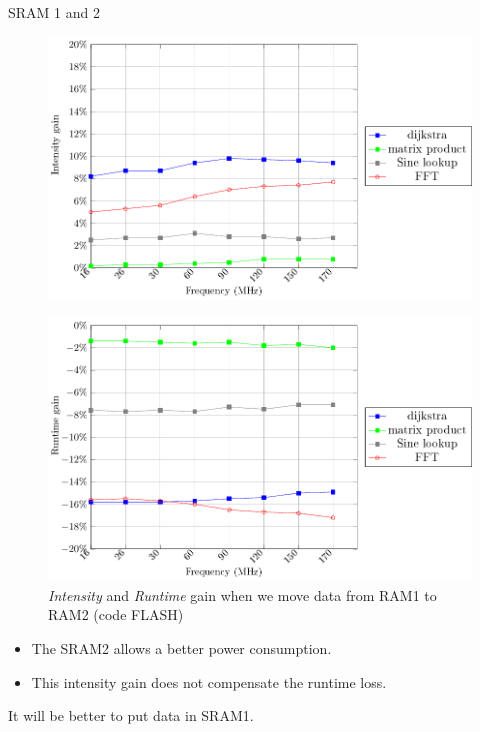 \documentclass[
	11pt, %
]{beamer}
\begin{document}
\begin{frame}{SRAM 1 and 2}
	\begin{minipage}{0.5\textwidth}
		\begin{figure}
			\includegraphics[scale = 0.35]{data/stm32g_v2/data_ram_data_ram2/intensity.pdf}
		\end{figure}
		\vspace*{-0.5cm}
		\begin{figure}
			\includegraphics[scale = 0.35]{data/stm32g_v2/data_ram_data_ram2/duration.pdf}
			\caption{\emph{Intensity} and \emph{Runtime} gain when we move data from RAM1 to RAM2 (code FLASH)}
		\end{figure}
	\end{minipage}
	\begin{minipage}{0.4\textwidth}
		\begin{itemize}
			\item The SRAM2 allows a better power consumption. 
			\item This intensity gain does not compensate the runtime loss. 
		\end{itemize}
		It will be better to put data in SRAM1.
	\end{minipage}
\end{frame}
\end{document}
